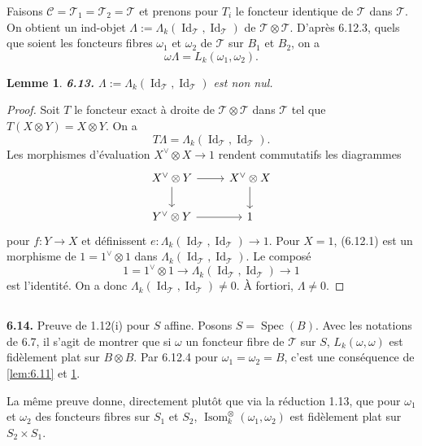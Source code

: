 \documentclass[12pt,a4paper]{article}
\theoremstyle{plain}
\newtheorem{lemma}[theorem]{Lemme}
\theoremstyle{definition}
\theoremstyle{remark}
\DeclareMathOperator{\Isom}{Isom}
\DeclareMathOperator{\Spec}{Spec}
\DeclareMathOperator{\Id}{Id}
\begin{document}
Faisons $\mathcal{C} = \mathcal{T}_1 = \mathcal{T}_2 = \mathcal{T}$ et prenons pour $T_i$ le foncteur identique de $\mathcal{T}$ dans $\mathcal{T}$. On obtient un ind-objet $\Lambda := \Lambda_k(\Id_\mathcal{T}, \Id_\mathcal{T})$ de $\mathcal{T} \otimes \mathcal{T}$. D'après 6.12.3, quels que soient les foncteurs fibres $\omega_1$ et $\omega_2$ de $\mathcal{T}$ sur $B_1$ et $B_2$, on a
\begin{equation}\label{eq:6.12.4}
\omega \Lambda = L_k(\omega_1, \omega_2).
\end{equation}

\begin{lemma}\label{lem:6.13}
\textbf{6.13.} $\Lambda := \Lambda_k(\Id_\mathcal{T}, \Id_\mathcal{T})$ est non nul.
\end{lemma}

\begin{proof}
Soit $T$ le foncteur exact à droite de $\mathcal{T} \otimes \mathcal{T}$ dans $\mathcal{T}$ tel que $T(X \otimes Y) = X \otimes Y$. On a
\[
T \Lambda = \Lambda_k(\Id_\mathcal{T}, \Id_\mathcal{T}).
\]
Les morphismes d'évaluation $X^\vee \otimes X \to 1$ rendent commutatifs les diagrammes
\[
\begin{tikzcd}
X^\vee \otimes Y \arrow[r] \arrow[d] & X^\vee \otimes X \arrow[d] \\
Y^\vee \otimes Y \arrow[r] & 1
\end{tikzcd}
\]
pour $f : Y \to X$ et définissent $e : \Lambda_k(\Id_\mathcal{T}, \Id_\mathcal{T}) \to 1$. Pour $X = 1$, (6.12.1) est un morphisme de $1 = 1^\vee \otimes 1$ dans $\Lambda_k(\Id_\mathcal{T}, \Id_\mathcal{T})$. Le composé
\[
1 = 1^\vee \otimes 1 \to \Lambda_k(\Id_\mathcal{T}, \Id_\mathcal{T}) \to 1
\]
est l'identité. On a donc $\Lambda_k(\Id_\mathcal{T}, \Id_\mathcal{T}) \neq 0$. À fortiori, $\Lambda \neq 0$.
\end{proof}

\subsection{}

\textbf{6.14.} Preuve de 1.12(i) pour $S$ affine. Posons $S = \Spec(B)$. Avec les notations de 6.7, il s'agit de montrer que si $\omega$ un foncteur fibre de $\mathcal{T}$ sur $S$, $L_k(\omega,\omega)$ est fidèlement plat sur $B \otimes B$. Par 6.12.4 pour $\omega_1 = \omega_2 = B$, c'est une conséquence de \ref{lem:6.11} et \ref{lem:6.13}.

La même preuve donne, directement plutôt que via la réduction 1.13, que pour $\omega_1$ et $\omega_2$ des foncteurs fibres sur $S_1$ et $S_2$, $\Isom^\otimes_k(\omega_1,\omega_2)$ est fidèlement plat sur $S_2 \times S_1$.
\end{document}
